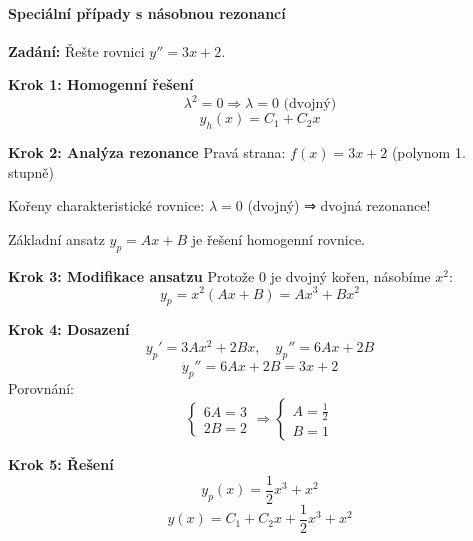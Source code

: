 \paragraph{Speciální případy s násobnou rezonancí}

\begin{example}
\label{ex:dvojna-rezonance-polynom}

\noindent\textbf{Zadání:} Řešte rovnici $y'' = 3x + 2$.

\vspace{1.5\baselineskip}

\noindent\textbf{Krok 1: Homogenní řešení}
\[
\lambda^2 = 0 \Rightarrow \lambda = 0 \text{ (dvojný)}
\]
\[
y_h(x) = C_1 + C_2 x
\]

\vspace{1\baselineskip}

\noindent\textbf{Krok 2: Analýza rezonance}
Pravá strana: $f(x) = 3x + 2$ (polynom 1. stupně)

Kořeny charakteristické rovnice: $\lambda = 0$ (dvojný) ⇒ dvojná rezonance!

Základní ansatz $y_p = Ax + B$ je řešení homogenní rovnice.

\vspace{1\baselineskip}

\noindent\textbf{Krok 3: Modifikace ansatzu}
Protože 0 je dvojný kořen, násobíme $x^2$:
\[
y_p = x^2(Ax + B) = Ax^3 + Bx^2
\]

\vspace{1\baselineskip}

\noindent\textbf{Krok 4: Dosazení}
\[
y_p' = 3Ax^2 + 2Bx, \quad y_p'' = 6Ax + 2B
\]
\[
y_p'' = 6Ax + 2B = 3x + 2
\]
Porovnání:
\[
\begin{cases}
6A = 3 \\
2B = 2
\end{cases}
\Rightarrow
\begin{cases}
A = \frac{1}{2} \\
B = 1
\end{cases}
\]

\vspace{1\baselineskip}

\noindent\textbf{Krok 5: Řešení}
\[
y_p(x) = \frac{1}{2}x^3 + x^2
\]
\[
y(x) = C_1 + C_2 x + \frac{1}{2}x^3 + x^2
\]

\end{example}

